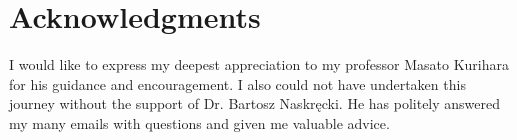 \documentclass[main]{subfiles}
\begin{document}
{}
\chapter*{Acknowledgments}
I would like to express my deepest appreciation to my professor Masato Kurihara for his guidance and encouragement.
I also could not have undertaken this journey without the support of Dr. Bartosz Naskręcki.
He has politely answered my many emails with questions and given me valuable advice.
\end{document}
